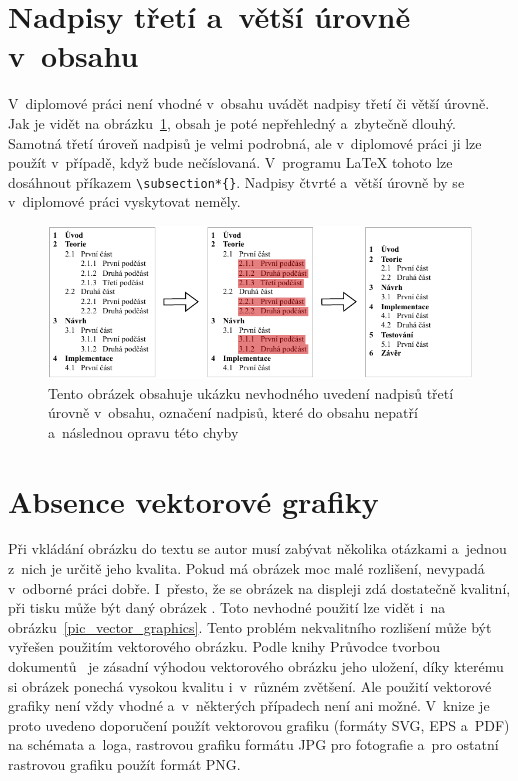 \section{Nadpisy třetí a~větší úrovně v~obsahu}
V~diplomové práci není vhodné v~obsahu uvádět nadpisy třetí či větší úrovně.
Jak je vidět na obrázku~\ref{pic_heading}, obsah je poté nepřehledný a~zbytečně
dlouhý. Samotná třetí úroveň nadpisů je velmi podrobná, ale v~diplomové práci
ji lze použít v~případě, když bude nečíslovaná. V~programu {\LaTeX} tohoto lze dosáhnout
příkazem \verb|\subsection*{}|. Nadpisy čtvrté a~větší úrovně by se v~diplomové
práci vyskytovat neměly.

\begin{figure}[H]
    \centering
    \includegraphics[width=\linewidth]{obrazky-figures/heading_example.pdf}
    \caption{
        Tento obrázek obsahuje ukázku nevhodného uvedení nadpisů třetí
        úrovně v~obsahu, označení nadpisů, které do obsahu nepatří
        a~následnou opravu této chyby
    }
    \label{pic_heading}
\end{figure}


\section{Absence vektorové grafiky} \label{vector_graphic}
Při vkládání obrázku do textu se autor musí zabývat několika otázkami a~jednou
z~nich je určitě jeho kvalita. Pokud má obrázek moc malé rozlišení,
nevypadá v~odborné práci dobře. I~přesto, že se obrázek na displeji zdá
dostatečně kvalitní, při tisku může být daný obrázek .
Toto nevhodné použití lze vidět i~na obrázku~\ref{pic_vector_graphics}.
Tento problém nekvalitního rozlišení může být vyřešen použitím vektorového obrázku.
Podle knihy Průvodce tvorbou dokumentů~\cite[k.~10, s.~56--61]{Pruvodce_tvorbou_dokumentu} 
je zásadní výhodou vektorového
obrázku jeho uložení, díky kterému si obrázek ponechá vysokou kvalitu i~v~různém
zvětšení. Ale použití vektorové grafiky není vždy vhodné a~v~některých případech
není ani možné. V~knize je proto uvedeno doporučení použít vektorovou grafiku
(formáty SVG, EPS a~PDF) na schémata a~loga, rastrovou grafiku formátu JPG pro
fotografie a~pro ostatní rastrovou grafiku použít formát PNG.

